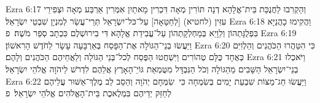 Ezra 6:17	וְהַקְרִבוּ לַחֲנֻכַּת בֵּית־אֱלָהָא דְנָה תּוֹרִין מְאָה דִּכְרִין מָאתַיִן אִמְּרִין אַרְבַּע מְאָה וּצְפִירֵי עִזִּין (לחטיא) [לְחַטָּאָה] עַל־כּל־יִשְׂרָאֵל תְּרֵי־עֲשַׂר לְמִנְיָן שִׁבְטֵי יִשְׂרָאֵל׃
Ezra 6:18	וַהֲקִימוּ כָהֲנַיָּא בִּפְלֻגָּתְהוֹן וְלֵוָיֵא בְּמַחְלְקָתְהוֹן עַל־עֲבִידַת אֱלָהָא דִּי בִירוּשְׁלֶם כִּכְתָב סְפַר מֹשֶׁה׃ {פ}
Ezra 6:19	וַיַּעֲשׂוּ בְנֵי־הַגּוֹלָה אֶת־הַפָּסַח בְּאַרְבָּעָה עָשָׂר לַחֹדֶשׁ הָרִאשׁוֹן׃
Ezra 6:20	כִּי הִטַּהֲרוּ הַכֹּהֲנִים וְהַלְוִיִּם כְּאֶחָד כֻּלָּם טְהוֹרִים וַיִּשְׁחֲטוּ הַפֶּסַח לְכל־בְּנֵי הַגּוֹלָה וְלַאֲחֵיהֶם הַכֹּהֲנִים וְלָהֶם׃
Ezra 6:21	וַיֹּאכְלוּ בְנֵי־יִשְׂרָאֵל הַשָּׁבִים מֵהַגּוֹלָה וְכֹל הַנִּבְדָּל מִטֻּמְאַת גּוֹיֵ־הָאָרֶץ אֲלֵהֶם לִדְרֹשׁ לַיהֹוָה אֱלֹהֵי יִשְׂרָאֵל׃
Ezra 6:22	וַיַּעֲשׂוּ חַג־מַצּוֹת שִׁבְעַת יָמִים בְּשִׂמְחָה כִּי  שִׂמְּחָם יְהֹוָה וְהֵסֵב לֵב מֶלֶךְ־אַשּׁוּר עֲלֵיהֶם לְחַזֵּק יְדֵיהֶם בִּמְלֶאכֶת בֵּית־הָאֱלֹהִים אֱלֹהֵי יִשְׂרָאֵל׃ {פ}
